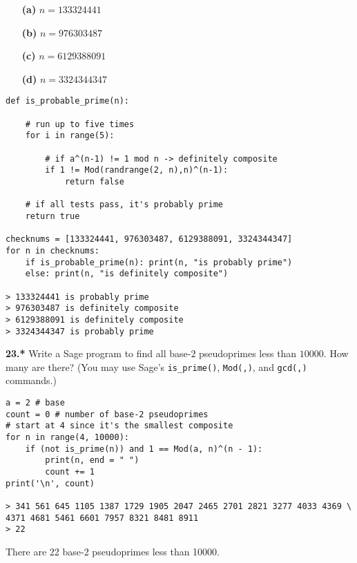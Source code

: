 \documentclass[12pt]{amsart}
\begin{document}
\begin{itemize}
\item[{\bf (a)}] $n=133324441$ \hskip1cm
\item[{\bf (b)}] $n=976303487$ \hskip1cm
\item[{\bf (c)}]  $n=6129388091$ \hskip1cm
\item[{\bf (d)}]  $n=3324344347$
\end{itemize}

\medskip

\begin{verbatim}
def is_probable_prime(n):
    
    # run up to five times
    for i in range(5):
        
        # if a^(n-1) != 1 mod n -> definitely composite
        if 1 != Mod(randrange(2, n),n)^(n-1): 
            return false
        
    # if all tests pass, it's probably prime
    return true

checknums = [133324441, 976303487, 6129388091, 3324344347]
for n in checknums:
    if is_probable_prime(n): print(n, "is probably prime")
    else: print(n, "is definitely composite")
    
> 133324441 is probably prime
> 976303487 is definitely composite
> 6129388091 is definitely composite
> 3324344347 is probably prime
\end{verbatim}

\newpage

{\bf 23.*}  Write a Sage program to find all base-$2$ pseudoprimes less than $10000$.  How many are there?  (You may use Sage's {\tt is\_prime()}, {\tt Mod(,)}, and {\tt gcd(,)} commands.)

\medskip

\begin{verbatim}
a = 2 # base
count = 0 # number of base-2 pseudoprimes
# start at 4 since it's the smallest composite
for n in range(4, 10000):
    if (not is_prime(n)) and 1 == Mod(a, n)^(n - 1):
        print(n, end = " ")
        count += 1
print('\n', count)

> 341 561 645 1105 1387 1729 1905 2047 2465 2701 2821 3277 4033 4369 \
4371 4681 5461 6601 7957 8321 8481 8911
> 22
\end{verbatim}

There are 22 base-2 pseudoprimes less than 10000. 
\end{document}
